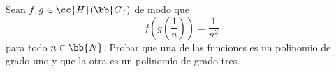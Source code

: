 \documentclass[12pt]{article}
\begin{document}
    \begin{ejercicio}[2.5 puntos]
        Sean $f, g \in \cc{H}(\bb{C})$ de modo que
        $$f\left(g\left(\frac{1}{n}\right)\right) = \frac{1}{n^3}$$
        para todo $n \in \bb{N}$.
        Probar que una de las funciones es un polinomio de grado uno y que la otra es un polinomio de grado tres.
    \end{ejercicio}
    
    
\end{document}
